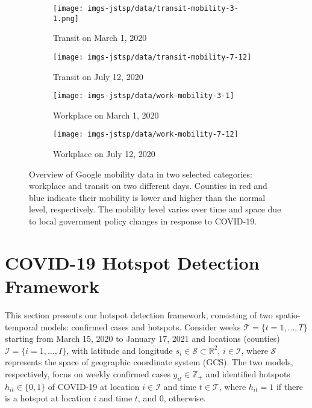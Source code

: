 \documentclass[journal]{IEEEtran}
\begin{document}
\begin{figure}[!ht]
\centering
\begin{subfigure}[h]{0.48\linewidth}
\texttt{[image: imgs-jstsp/data/transit-mobility-3-1.png]}
\caption{Transit on March 1, 2020}
\end{subfigure}
\begin{subfigure}[h]{0.48\linewidth}
\texttt{[image: imgs-jstsp/data/transit-mobility-7-12]}
\caption{Transit on July 12, 2020}
\end{subfigure}
\vfill
\begin{subfigure}[h]{0.48\linewidth}
\texttt{[image: imgs-jstsp/data/work-mobility-3-1]}
\caption{Workplace on March 1, 2020}
\end{subfigure}
\begin{subfigure}[h]{0.48\linewidth}
\texttt{[image: imgs-jstsp/data/work-mobility-7-12]}
\caption{Workplace on July 12, 2020}
\end{subfigure}
\caption{Overview of Google mobility data in two selected categories: workplace and transit on two different days. Counties in red and blue indicate their mobility is lower and higher than the normal level, respectively. The mobility level varies over time and space due to local government policy changes in response to COVID-19.}
\label{fig:data-mobility}
\end{figure}


\section{COVID-19 Hotspot Detection Framework}
\label{sec:framework}

This section presents our hotspot detection framework, consisting of two spatio-temporal models: confirmed cases and hotspots.
Consider weeks $\mathscr{T} = \{t=1, \dots, T\}$ starting from March 15, 2020 to January 17, 2021 and locations (counties) $\mathscr{I} = \{i=1, \dots, I\}$, 
with latitude and longitude $s_i \in \mathscr{S} \subset \mathbb{R}^2$, $i \in \mathscr{I}$, where $\mathscr{S}$ represents the space of geographic coordinate system (GCS). 
The two models, respectively, focus on weekly confirmed cases $y_{it} \in \mathbb{Z}_+$ and identified hotspots $h_{it} \in \{0, 1\}$ of COVID-19 at location $i \in \mathscr{I}$ and time $t \in \mathscr{T}$, where $h_{it} = 1$ if there is a hotspot at location $i$ and time $t$, and 0, otherwise. 
\end{document}
